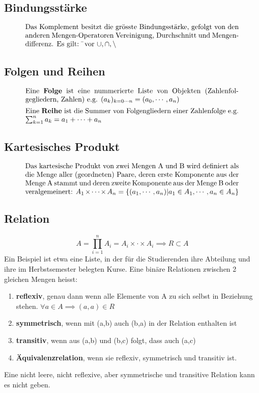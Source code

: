 \subsection{Bindungsstärke}
\begin{equation}
    \parbox{30em}{Das Komplement besitzt 
    die grösste Bindungsstärke, gefolgt von den anderen Mengen-Operatoren Vereinigung, Durchschnitt und Mengendifferenz. Es gilt: \(\bar{}\) vor \(\cup,\cap,\backslash\)}
\end{equation}
\subsection{Folgen und Reihen}
\begin{equation}
    \parbox{30em}{Eine \textbf{Folge} ist eine nummerierte Liste von Objekten (Zahlenfolgegliedern, Zahlen) e.g. \((a_k)_{k=0 \cdots n} = (a_0, \cdots,a_n)\)}
\end{equation}
\begin{equation}
    \parbox{30em}{Eine \textbf{Reihe} ist die Summer von Folgengliedern einer Zahlenfolge e.g. \(\sum_{k=1}^{n}{a_k}=a_1+\cdots+a_n\)}
\end{equation}
\subsection{Kartesisches Produkt}
\begin{equation}
    \parbox{30em}{Das kartesische Produkt von zwei Mengen A und B wird definiert als die Menge aller (geordneten) Paare, 
    deren erste Komponente aus der Menge A stammt und deren zweite Komponente aus der Menge B oder veralgemeinert: 
    \(A_1 \times \cdots \times A_n=\{ (a_1, \cdots ,a_n) | a_1 \in A_1, \cdots ,a_n \in A_n \}\)}
\end{equation}
\subsection{Relation}
\begin{equation}
    A = \prod_{i=1}^{n} A_i = A_i \times \cdot \times A_i \implies R \subset A
\end{equation}
Ein Beispiel ist etwa eine Liste, in der für die Studierenden ihre Abteilung und ihre im Herbstsemester belegten Kurse.
Eine binäre Relationen zwischen 2 gleichen Mengen heisst:
\begin{enumerate}
    \item \textbf{reflexiv}, genau dann wenn alle Elemente von A zu sich selbst in Beziehung stehen. \(\forall a \in A \implies (a,a) \in R\)
    \item \textbf{symmetrisch}, wenn mit (a,b) auch (b,a) in der Relation enthalten ist
    \item \textbf{transitiv}, wenn aus (a,b) und (b,c) folgt, dass auch (a,c)
    \item \textbf{Äquivalenzrelation}, wenn sie reflexiv, symmetrisch und transitiv ist.
\end{enumerate}
Eine nicht leere, nicht reflexive, aber symmetrische und transitive Relation kann es nicht 
geben.
